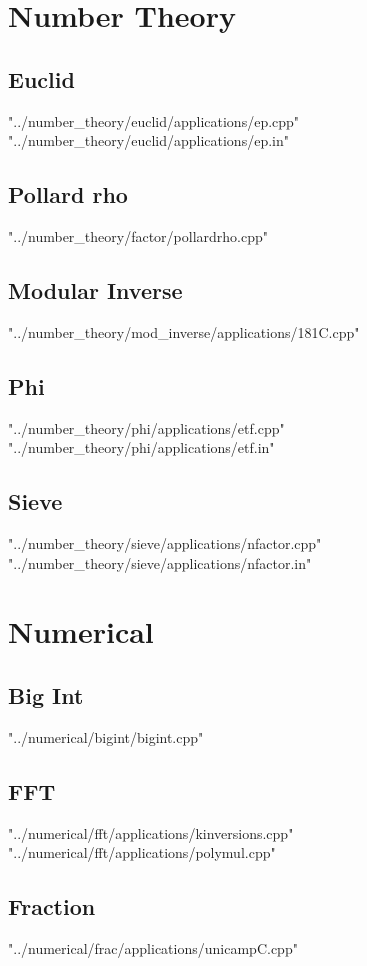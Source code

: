 \documentclass [12pt,onecolumn,oneside]{article}
\begin{document}
\section{Number Theory}
\subsection{ Euclid}
 {"../number_theory/euclid/applications/ep.cpp"}
 {"../number_theory/euclid/applications/ep.in"}
\subsection{ Pollard rho}
 {"../number_theory/factor/pollardrho.cpp"}
\subsection{ Modular Inverse}
 {"../number_theory/mod_inverse/applications/181C.cpp"}
\subsection{ Phi}
 {"../number_theory/phi/applications/etf.cpp"}
 {"../number_theory/phi/applications/etf.in"}
\subsection{ Sieve}
 {"../number_theory/sieve/applications/nfactor.cpp"}
 {"../number_theory/sieve/applications/nfactor.in"}
\newpage

\section{Numerical}
\subsection{ Big Int}
 {"../numerical/bigint/bigint.cpp"}
\subsection{ FFT}
 {"../numerical/fft/applications/kinversions.cpp"}
 {"../numerical/fft/applications/polymul.cpp"}
\subsection{ Fraction}
 {"../numerical/frac/applications/unicampC.cpp"}
\end{document}
